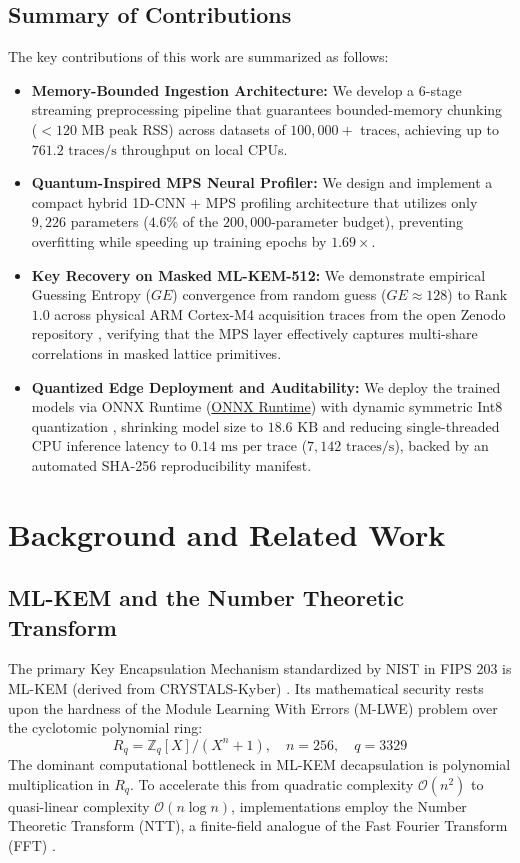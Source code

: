 \documentclass[letterpaper]{article}
\begin{document}
\subsection{Summary of Contributions}
The key contributions of this work are summarized as follows:
\begin{itemize}
    \item \textbf{Memory-Bounded Ingestion Architecture:} We develop a 6-stage streaming preprocessing pipeline that guarantees bounded-memory chunking ($<120\text{ MB}$ peak RSS) across datasets of $100,000+$ traces, achieving up to $761.2\text{ traces/s}$ throughput on local CPUs.
    \item \textbf{Quantum-Inspired MPS Neural Profiler:} We design and implement a compact hybrid 1D-CNN + MPS profiling architecture that utilizes only $9,226$ parameters ($4.6\%$ of the $200,000$-parameter budget), preventing overfitting while speeding up training epochs by $1.69\times$.
    \item \textbf{Key Recovery on Masked ML-KEM-512:} We demonstrate empirical Guessing Entropy ($GE$) convergence from random guess ($GE \approx 128$) to Rank $1.0$ across physical ARM Cortex-M4 acquisition traces from the open Zenodo repository \cite{zenodo_kyber_dataset,danvers2022side}, verifying that the MPS layer effectively captures multi-share correlations in masked lattice primitives.
    \item \textbf{Quantized Edge Deployment and Auditability:} We deploy the trained models via ONNX Runtime (\href{https://onnxruntime.ai/}{ONNX Runtime}) \cite{onnxruntime2021} with dynamic symmetric Int8 quantization \cite{jacob2018quantization,gholami2022survey}, shrinking model size to $18.6\text{ KB}$ and reducing single-threaded CPU inference latency to $0.14\text{ ms per trace}$ ($7,142\text{ traces/s}$), backed by an automated SHA-256 reproducibility manifest.
\end{itemize}

\section{Background and Related Work}

\subsection{ML-KEM and the Number Theoretic Transform}
The primary Key Encapsulation Mechanism standardized by NIST in FIPS 203 is ML-KEM (derived from CRYSTALS-Kyber) \cite{nist_fips203,bos2018crystals}. Its mathematical security rests upon the hardness of the Module Learning With Errors (M-LWE) problem over the cyclotomic polynomial ring:
\begin{equation}
R_q = \mathbb{Z}_q[X]/(X^n + 1), \quad n = 256, \quad q = 3329
\label{eq:ring_def}
\end{equation}
The dominant computational bottleneck in ML-KEM decapsulation is polynomial multiplication in $R_q$. To accelerate this from quadratic complexity $\mathcal{O}(n^2)$ to quasi-linear complexity $\mathcal{O}(n \log n)$, implementations employ the Number Theoretic Transform (NTT), a finite-field analogue of the Fast Fourier Transform (FFT) \cite{lyubashevsky2013ideal}.
\end{document}

